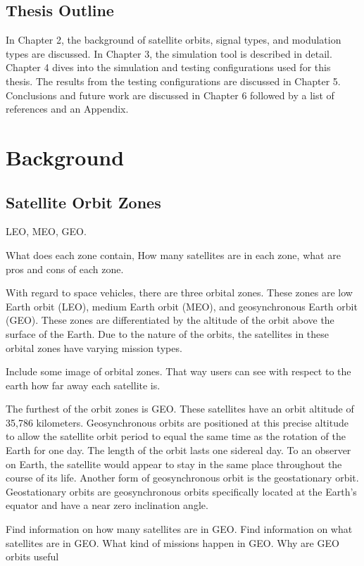 \documentclass[12pt]{report}
\begin{document}
\section{Thesis Outline}
In Chapter 2, the background of satellite orbits, signal types, and modulation types are discussed. In Chapter 3, the simulation tool is described in detail. Chapter 4 dives into the simulation and testing configurations used for this thesis. The results from the testing configurations are discussed in Chapter 5. Conclusions and future work are discussed in Chapter 6 followed by a list of references and an Appendix.


\chapter{Background}

\section{Satellite Orbit Zones}
LEO, MEO, GEO.

What does each zone contain, How many satellites are in each zone, what are pros and cons of each zone.

With regard to space vehicles, there are three orbital zones. These zones are low Earth orbit (LEO), medium Earth orbit (MEO), and geosynchronous Earth orbit (GEO). These zones are differentiated by the altitude of the orbit above the surface of the Earth. Due to the nature of the orbits, the satellites in these orbital zones have varying mission types. 

Include some image of orbital zones. That way users can see with respect to the earth how far away each satellite is. 


The furthest of the orbit zones is GEO. These satellites have an orbit altitude of 35,786 kilometers. Geosynchronous orbits are positioned at this precise altitude to allow the satellite orbit period to equal the same time as the rotation of the Earth for one day. The length of the orbit lasts one sidereal day. To an observer on Earth, the satellite would appear to stay in the same place throughout the course of its life. Another form of geosynchronous orbit is the geostationary orbit. Geostationary orbits are geosynchronous orbits specifically located at the Earth's equator and have a near zero inclination angle. 

Find information on how many satellites are in GEO. Find information on what satellites are in GEO. What kind of missions happen in GEO. Why are GEO orbits useful 
\end{document}
